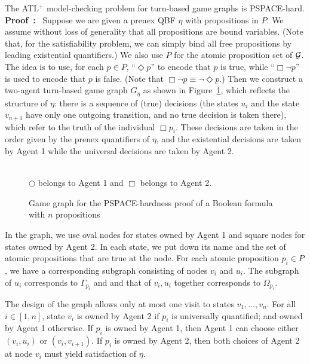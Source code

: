 \documentclass[11pt]{article}
\newcommand{\calg}{{\cal G}}
\newcommand{\pf}{\noindent\mbox{\bf Proof : }}
\newcommand{\pfrr}{\Box}
\newcommand{\pevt}{\Diamond}
\begin{document}
{\lemma \label{lemma.bsil.mck.nphard}
The ATL$^+$ model-checking problem for turn-based game graphs is PSPACE-hard.
}
\\\pf 
Suppose we are given a prenex QBF $\eta$ with propositions in $P$.
We assume without loss of generality that all propositions are bound variables.
(Note that, for the satisfiability problem, we can simply bind all free propositions by leading existential quantifiers.)
We also use $P$ for the atomic proposition set of $\calg$.  
The idea is to use, for each $p\in P$,  
``$\pevt p$'' 
to encode that $p$ is true, while 
``$\pfrr\neg p$'' is used
to encode that $p$ is false.
(Note that $\pfrr\neg p\equiv \neg\pevt p$.)   
Then we construct a two-agent turn-based game graph $G_\eta$ as shown
in Figure~\ref{fig.gg.bsil.nphard}, which reflects the structure of $\eta$:
there is a sequence of (true) decisions (the states $u_i$ and the state $v_{n+1}$
have only one outgoing transition, and no true decision is taken there), which refer to the truth of the individual $\pfrr p_i$.
These decisions are taken in the order given by the prenex quantifiers of $\eta$,
and the existential decisions are taken by Agent 1 while the universal decisions are taken by Agent 2.
\begin{figure}[!ht]
\begin{center}
% 
\\
$\bigcirc$ belongs to Agent 1 and $\pfrr$ belongs to Agent 2.
\end{center}
\caption{Game graph for the PSPACE-hardness proof of a Boolean formula
with $n$ propositions}
\label{fig.gg.bsil.nphard}
\end{figure}

In the graph, we use oval nodes for states owned by Agent 1 and 
square nodes for states owned by Agent 2.
In each state, we put down its name and the set of atomic
propositions that are true at the node.
For each atomic proposition $p_i\in P$,
we have a corresponding subgraph consisting of nodes
$v_i$ and $u_i$.
The subgraph of $u_i$ corresponds to $\Gamma_{p_i}$ and
and that of $v_i,u_i$ together corresponds to $\Omega_{p_i}$.  

The design of the graph allows only at most one visit
to states $v_1,\ldots,v_n$.
For all $i\in[1,n]$, state $v_i$ is owned by Agent 2 if $p_i$ is
universally quantified;
and owned by Agent 1 otherwise.
If $p_i$ is owned by Agent 1,
then Agent 1 can choose either
$(v_i,u_i)$ or $(v_i,v_{i+1})$.
If $p_i$ is owned by Agent 2,
then both choices of Agent 2 at node $v_i$ must yield
satisfaction of $\eta$.
\end{document}

